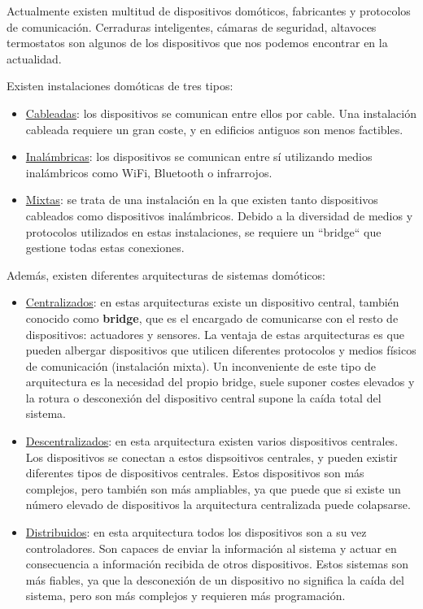 
Actualmente existen multitud de dispositivos domóticos, fabricantes y protocolos de comunicación. Cerraduras inteligentes, cámaras de seguridad, altavoces
termostatos son algunos de los dispositivos que nos podemos encontrar en la actualidad.
\par
Existen instalaciones domóticas de tres tipos:
\begin{itemize}
\item\underline{Cableadas}: los dispositivos se comunican entre ellos por cable. Una instalación cableada requiere un gran coste, y en edificios antiguos 
son menos factibles.
\item\underline{Inalámbricas}: los dispositivos se comunican entre sí utilizando medios inalámbricos como WiFi, Bluetooth o infrarrojos.
\item\underline{Mixtas}: se trata de una instalación en la que existen tanto dispositivos cableados como dispositivos inalámbricos. Debido a la diversidad
de medios y protocolos utilizados en estas instalaciones, se requiere un ``bridge`` que gestione todas estas conexiones.
\end{itemize}

Además, existen diferentes arquitecturas de sistemas domóticos:
\begin{itemize}
\item\underline{Centralizados}: en estas arquitecturas existe un dispositivo central, también conocido como \textbf{bridge}, que es el encargado
de comunicarse con el resto de dispositivos: actuadores y sensores. La ventaja de estas arquitecturas es que pueden albergar dispositivos que utilicen
diferentes protocolos y medios físicos de comunicación (instalación mixta). Un inconveniente de este tipo de arquitectura es la necesidad del
 propio bridge, suele suponer costes elevados y la rotura o desconexión del dispositivo central supone la caída total del sistema.
\item\underline{Descentralizados}: en esta arquitectura existen varios dispositivos centrales. Los dispositivos se conectan a estos dispsoitivos centrales, 
y pueden existir diferentes tipos de dispositivos centrales. Estos dispositivos son más complejos, pero también son más ampliables, ya que puede que si existe
un número elevado de dispositivos la arquitectura centralizada puede colapsarse.
\item\underline{Distribuidos}: en esta arquitectura todos los dispositivos son a su vez controladores. Son capaces de enviar la información al sistema y actuar 
en consecuencia a información recibida de otros dispositivos. Estos sistemas son más fiables, ya que la desconexión de un dispositivo no significa 
la caída del sistema, pero son más complejos y requieren más programación.
\end{itemize}

